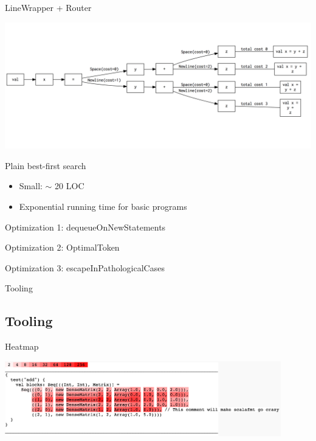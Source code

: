 \documentclass[xcolor=dvipsnames]{beamer}
\theoremstyle{definition}
\begin{document}
\begin{frame}{LineWrapper + Router}
  \begin{center}
    \includegraphics[width=\textwidth]{img/router2.png}
  \end{center}
\end{frame}

\begin{frame}{Plain best-first search}
  \begin{itemize}
    \item Small: $\sim$ 20 LOC
    \item Exponential running time for basic programs
  \end{itemize}
\end{frame}


\begin{frame}{Optimization 1: dequeueOnNewStatements}
  
\end{frame}

\begin{frame}{Optimization 2: OptimalToken}
  
\end{frame}

\begin{frame}{Optimization 3: escapeInPathologicalCases}
  
\end{frame}

%   
%
\begin{frame}{}
  \begin{center}
    \Huge Tooling
  \end{center}
\end{frame}
\subsection{Tooling} %
\begin{frame}{Heatmap}
  \begin{center}
    \includegraphics[width=0.9\textwidth]{img/heatmap.png}
  \end{center}
\end{frame}
\end{document}
